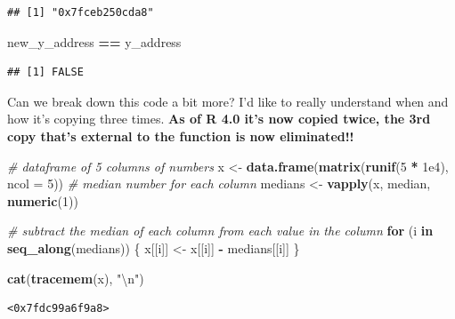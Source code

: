 \documentclass[]{book}
\newenvironment{Shaded}{\begin{snugshade}}{\end{snugshade}}
\newcommand{\CharTok}[1]{\textcolor[rgb]{0.31,0.60,0.02}{#1}}
\newcommand{\CommentTok}[1]{\textcolor[rgb]{0.56,0.35,0.01}{\textit{#1}}}
\newcommand{\ControlFlowTok}[1]{\textcolor[rgb]{0.13,0.29,0.53}{\textbf{#1}}}
\newcommand{\DataTypeTok}[1]{\textcolor[rgb]{0.13,0.29,0.53}{#1}}
\newcommand{\DecValTok}[1]{\textcolor[rgb]{0.00,0.00,0.81}{#1}}
\newcommand{\FloatTok}[1]{\textcolor[rgb]{0.00,0.00,0.81}{#1}}
\newcommand{\KeywordTok}[1]{\textcolor[rgb]{0.13,0.29,0.53}{\textbf{#1}}}
\newcommand{\NormalTok}[1]{#1}
\newcommand{\OperatorTok}[1]{\textcolor[rgb]{0.81,0.36,0.00}{\textbf{#1}}}
\newcommand{\StringTok}[1]{\textcolor[rgb]{0.31,0.60,0.02}{#1}}
\begin{document}
\begin{verbatim}
## [1] "0x7fceb250cda8"
\end{verbatim}

\begin{Shaded}
\begin{Highlighting}[]
\NormalTok{new_y_address }\OperatorTok{==}\StringTok{ }\NormalTok{y_address}
\end{Highlighting}
\end{Shaded}

\begin{verbatim}
## [1] FALSE
\end{verbatim}

Can we break down this code a bit more? I'd like to really understand when and how it's copying three times. \textbf{As of R 4.0 it's now copied twice, the 3rd copy that's external to the function is now eliminated!!}

\begin{Shaded}
\begin{Highlighting}[]
\CommentTok{# dataframe of 5 columns of numbers}
\NormalTok{x <-}\StringTok{ }\KeywordTok{data.frame}\NormalTok{(}\KeywordTok{matrix}\NormalTok{(}\KeywordTok{runif}\NormalTok{(}\DecValTok{5} \OperatorTok{*}\StringTok{ }\FloatTok{1e4}\NormalTok{), }\DataTypeTok{ncol =} \DecValTok{5}\NormalTok{))}
\CommentTok{# median number for each column}
\NormalTok{medians <-}\StringTok{ }\KeywordTok{vapply}\NormalTok{(x, median, }\KeywordTok{numeric}\NormalTok{(}\DecValTok{1}\NormalTok{))}

\CommentTok{# subtract the median of each column from each value in the column}
\ControlFlowTok{for}\NormalTok{ (i }\ControlFlowTok{in} \KeywordTok{seq_along}\NormalTok{(medians)) \{}
\NormalTok{  x[[i]] <-}\StringTok{ }\NormalTok{x[[i]] }\OperatorTok{-}\StringTok{ }\NormalTok{medians[[i]]}
\NormalTok{\}}
\end{Highlighting}
\end{Shaded}

\begin{Shaded}
\begin{Highlighting}[]
\KeywordTok{cat}\NormalTok{(}\KeywordTok{tracemem}\NormalTok{(x), }\StringTok{"}\CharTok{\textbackslash{}n}\StringTok{"}\NormalTok{)}
\end{Highlighting}
\end{Shaded}

\begin{verbatim}
<0x7fdc99a6f9a8> 
\end{verbatim}
\end{document}
